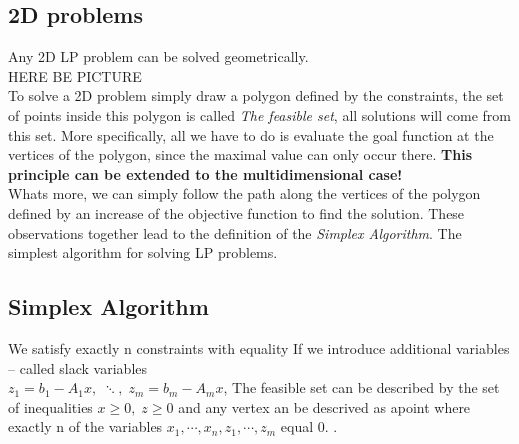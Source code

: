 \subsection{2D problems}
Any 2D LP problem can be solved geometrically.\\
HERE BE PICTURE\\
To solve a 2D problem simply draw a polygon defined by the constraints, the set of points inside this polygon is called \textit{The feasible set}, all solutions will come from this set. More specifically, all we have to do is evaluate the goal function at the vertices of the polygon, since the maximal value can only occur there. \textbf{This principle can be extended to the multidimensional case!}\\
Whats more, we can simply follow the path along the vertices of the polygon defined by an increase of the objective function to find the solution.
\nt
{
    These observations together lead to the definition of the \textit{Simplex Algorithm}. The simplest algorithm for solving LP problems.
}
\subsection{Simplex Algorithm}
\sol We satisfy exactly n constraints with equality
    If we introduce additional variables -- called slack variables\\
    $z_1 = b_1 -A_1x,\; \ddots,\; z_m = b_m - A_mx$, The feasible set can be described by the set of inequalities $x \ge 0,\; z \ge 0$ and any vertex an be descrived as apoint where exactly n of the variables  $x_1,\cdots ,x_n,z_1,\cdots ,z_m$ equal 0.
    .

